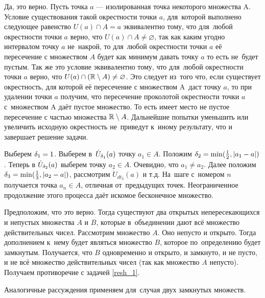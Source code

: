 \begin{solution}{1.6}
Да, это верно. Пусть точка $a$ --- изолированная точка некоторого множества A. Условие существования такой окрестности точки $a$, для~которой выполнено следующее равенство $U(a) \cap A = a$ эквивалентно тому, что для~любой окрестности точки $a$ верно, что $U(a) \cap A \ne \varnothing $, так как каким угодно интервалом точку $a$ не~накрой, то для~любой окрестности точки $a$ её пересечение с множеством $A$ будет как минимум давать точку $a$ то есть не~будет пустым. Так же это условие эквивалентно тому, что для~любой окрестности точки $a$ верно, что $U(a) \cap (\mathbb R \setminus A)\ne \varnothing$. Это следует из~того что, если существует окрестность, для которой её пересечение с множеством A~даст точку $a$, то при удалении точки $a$ получим, что пересечение проколотой окрестности точки $a$ с~множеством A даёт пустое множество. То есть имеет место не пустое пересечение с частью множества $\mathbb R \setminus A$. Дальнейшие попытки уменьшить или увеличить исходную окрестность не~приведут к~иному результату, что и завершает решение задачи.
\end{solution}
\begin{solution}{1.7}
Выберем $\delta_1=1$. Выберем в~$\dot U_{\delta_1} (a)$ точку $a_1 \in A$. Положим $\delta_2 = \min (\frac{1}{2}, |a_1 - a|)$. Теперь в $\dot U_{\delta_2} (a)$ выберем точку $a_2 \in A$. Очевидно, что $a_1 \ne a_2$. Далее положим $\delta_3 = \min (\frac{1}{3}, |a_2 - a|)$, рассмотрим $\dot U_{dt_3} (a)$ и т.д. На~шаге с~номером $n$ получается точка $a_n \in A$, отличная от~предыдущих точек. Неограниченное продолжение этого процесса даёт искомое бесконечное множество.
\end{solution}
\begin{solution}{1.8}

\end{solution}
\begin{solution}{1.9}
Предположим, что это верно. Тогда существуют два открытых непересекающихся и непустых множества $A$ и $B$, которые в~объединении дают всё множество действительных чисел. Рассмотрим множество $A$. Оно непусто и открыто. Тогда дополнением к~нему будет являться множество $B$, которое по~определению будет замкнутым. Получается, что $B$ одновременно и открыто, и замкнуто, и не пусто, и не всё множество действительных чисел (так как множество $A$ непусто). Получаем противоречие с задачей \ref{resh_1}.

Аналогичные рассуждения применяем для~случая двух замкнутых множеств.
\end{solution}
